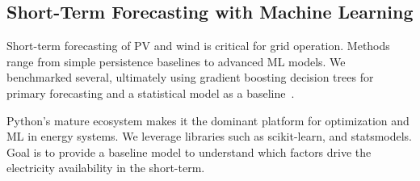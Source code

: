 \subsection{Short-Term Forecasting with Machine Learning}
Short-term forecasting of PV and wind is critical for grid operation. Methods range from simple persistence 
baselines to advanced ML models. We benchmarked several, ultimately using gradient boosting decision trees for primary 
forecasting and a statistical model as a baseline~\cite{grzebyk2021xgboost, zhong2020xgboost}.

Python’s mature ecosystem makes it the dominant platform for optimization and ML in energy systems. We leverage 
libraries such as scikit-learn, and statsmodels. Goal is to provide a baseline model to understand which factors drive
the electricity availability in the short-term.